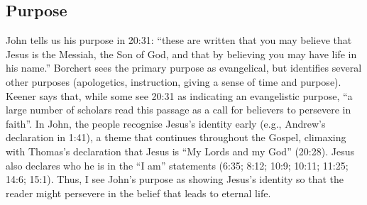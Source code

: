 \subsection{Purpose}

John tells us his purpose in 20:31: \enquote{these are written that you may
believe that Jesus is the Messiah, the Son of God, and that by believing you may
have life in his name.} Borchert sees the primary purpose as evangelical, but
identifies several other purposes (apologetics, instruction, giving a sense of
time and purpose).\autocites[31--37]{borchert:1996} Keener says that, while some
see 20:31 as indicating an evangelistic purpose, \enquote{a large number of
scholars read this passage as a call for believers to persevere in
faith}.\autocite[428]{keener:2013} In John, the people recognise Jesus's
identity early (e.g., Andrew's declaration in 1:41), a theme that continues
throughout the Gospel, climaxing with Thomas's declaration that Jesus is
\enquote{My Lords and my God} (20:28). Jesus also declares who he is in the
\enquote{I am} statements (6:35; 8:12; 10:9; 10:11; 11:25; 14:6;
15:1).\autocite[429]{keener:2013} Thus, I see John's purpose as showing Jesus's
identity so that the reader might persevere in the belief that leads to eternal
life.



